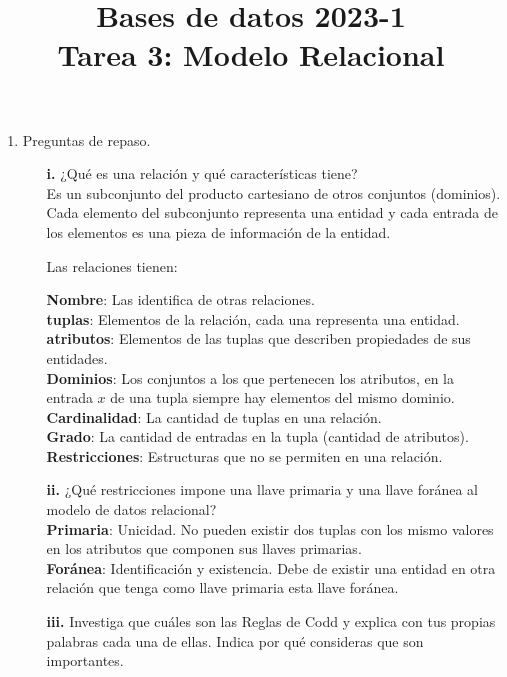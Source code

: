 \documentclass[12pt,a4paper]{article}
\title{Bases de datos 2023-1\\
Tarea 3: Modelo Relacional}
\begin{document}
\maketitle

\begin{enumerate}
	\item Preguntas de repaso.
		\begin{enumerate}
			\item[\textbf{i.}] ¿Qué es una relación y qué características tiene?\\

				Es un subconjunto del producto cartesiano de otros conjuntos (dominios).
				Cada elemento del subconjunto representa una entidad y cada entrada de los
				elementos es una pieza de información de la entidad.

				Las relaciones tienen:

				\textbf{Nombre}: Las identifica de otras relaciones.\\
				\textbf{tuplas}: Elementos de la relación, cada una representa una entidad.\\
				\textbf{atributos}: Elementos de las tuplas que describen propiedades de sus entidades.\\
				\textbf{Dominios}: Los conjuntos a los que pertenecen los atributos, en la entrada $x$
				de una tupla siempre hay elementos del mismo dominio.\\
				\textbf{Cardinalidad}: La cantidad de tuplas en una relación.\\
				\textbf{Grado}: La cantidad de entradas en la tupla (cantidad de atributos).\\
				\textbf{Restricciones}: Estructuras que no se permiten en una relación.\\	


			\item[\textbf{ii.}] ¿Qué restricciones impone una llave primaria y
				una llave foránea al modelo de datos relacional?\\

				\textbf{Primaria}: Unicidad. No pueden existir dos tuplas con los mismo valores
				en los atributos que componen sus llaves primarias.\\

				\textbf{Foránea}: Identificación y existencia. Debe de existir una entidad
				en otra relación que tenga como llave primaria esta llave foránea.\\


				\pagebreak
			\item[\textbf{iii.}] Investiga que cuáles son las Reglas de Codd y explica con tus propias palabras
				cada una de ellas. Indica por qué consideras que son importantes.\\


\end{enumerate}
\end{enumerate}
\end{document}

